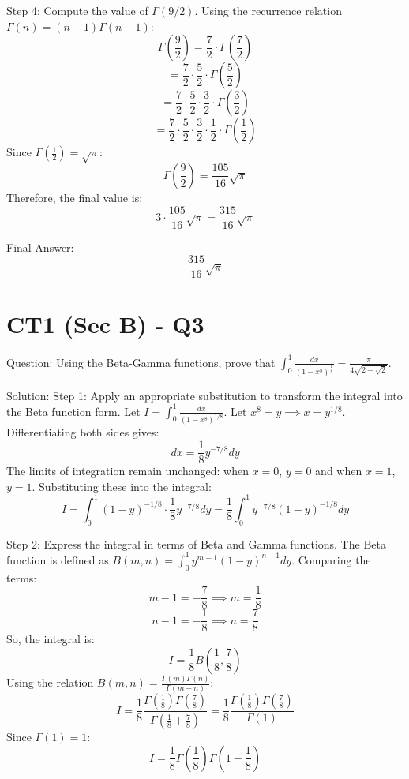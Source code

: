 \documentclass[11pt, a4paper]{article}
\begin{document}
Step 4: Compute the value of \(\Gamma(9/2)\).
Using the recurrence relation \(\Gamma(n) = (n-1)\Gamma(n-1)\):
\[
\Gamma\left(\frac{9}{2}\right) = \frac{7}{2} \cdot \Gamma\left(\frac{7}{2}\right)
\]
\[
= \frac{7}{2} \cdot \frac{5}{2} \cdot \Gamma\left(\frac{5}{2}\right)
\]
\[
= \frac{7}{2} \cdot \frac{5}{2} \cdot \frac{3}{2} \cdot \Gamma\left(\frac{3}{2}\right)
\]
\[
= \frac{7}{2} \cdot \frac{5}{2} \cdot \frac{3}{2} \cdot \frac{1}{2} \cdot \Gamma\left(\frac{1}{2}\right)
\]
Since \(\Gamma\left(\frac{1}{2}\right) = \sqrt{\pi}\):
\[
\Gamma\left(\frac{9}{2}\right) = \frac{105}{16}\sqrt{\pi}
\]
Therefore, the final value is:
\[
3 \cdot \frac{105}{16}\sqrt{\pi} = \frac{315}{16}\sqrt{\pi}
\]

Final Answer:
\[
\boxed{\frac{315}{16}\sqrt{\pi}}
\]


\section*{CT1 (Sec B) - Q3}
Question:
Using the Beta-Gamma functions, prove that \(\int_{0}^{1} \frac{dx}{(1-x^8)^{\frac{1}{8}}} = \frac{\pi}{4\sqrt{2-\sqrt{2}}}\).

Solution:
Step 1: Apply an appropriate substitution to transform the integral into the Beta function form.
Let \(I = \int_{0}^{1} \frac{dx}{(1-x^8)^{1/8}}\).
Let \(x^8 = y \implies x = y^{1/8}\).
Differentiating both sides gives:
\[
dx = \frac{1}{8} y^{-7/8} dy
\]
The limits of integration remain unchanged: when \(x = 0\), \(y = 0\) and when \(x = 1\), \(y = 1\).
Substituting these into the integral:
\[
I = \int_{0}^{1} (1-y)^{-1/8} \cdot \frac{1}{8} y^{-7/8} dy = \frac{1}{8} \int_{0}^{1} y^{-7/8} (1-y)^{-1/8} dy
\]

Step 2: Express the integral in terms of Beta and Gamma functions.
The Beta function is defined as \(B(m, n) = \int_{0}^{1} y^{m-1} (1-y)^{n-1} dy\).
Comparing the terms:
\[
m - 1 = -\frac{7}{8} \implies m = \frac{1}{8}
\]
\[
n - 1 = -\frac{1}{8} \implies n = \frac{7}{8}
\]
So, the integral is:
\[
I = \frac{1}{8} B\left(\frac{1}{8}, \frac{7}{8}\right)
\]
Using the relation \(B(m, n) = \frac{\Gamma(m)\Gamma(n)}{\Gamma(m+n)}\):
\[
I = \frac{1}{8} \frac{\Gamma\left(\frac{1}{8}\right)\Gamma\left(\frac{7}{8}\right)}{\Gamma\left(\frac{1}{8} + \frac{7}{8}\right)} = \frac{1}{8} \frac{\Gamma\left(\frac{1}{8}\right)\Gamma\left(\frac{7}{8}\right)}{\Gamma(1)}
\]
Since \(\Gamma(1) = 1\):
\[
I = \frac{1}{8} \Gamma\left(\frac{1}{8}\right)\Gamma\left(1 - \frac{1}{8}\right)
\]
\end{document}

